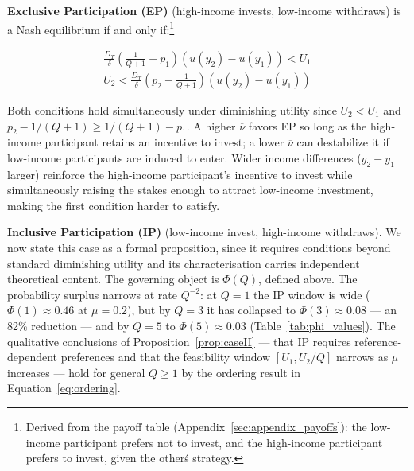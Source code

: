 \documentclass[
    oneside,
    fontsize=10pt,leqno]{article}
\begin{document}
\medskip
\noindent\textbf{Exclusive Participation (EP)} (high-income invests, low-income withdraws) is a Nash
equilibrium if and only if:\footnote{Derived from the payoff table (Appendix~\ref{sec:appendix_payoffs}): the low-income participant prefers not to invest, and the high-income participant prefers to invest, given the other\'s strategy.}

\begin{gather}
\frac{D_{T}}{\delta}\left(\frac{1}{Q+1}-p_{1}\right)(u(y_{2})-u(y_{1}))<U_{1}\label{eq:caseI_poor}\\
U_{2}<\frac{D_{T}}{\delta}\left(p_{2}-\frac{1}{Q+1}\right)(u(y_{2})-u(y_{1}))\label{eq:caseI_rich}
\end{gather}

Both conditions hold simultaneously under diminishing utility since
$U_{2}<U_{1}$ and $p_{2}-1/(Q+1)\geq1/(Q+1)-p_{1}$. A higher
$\overline{\nu}$ favors EP so long as the high-income participant retains an incentive
to invest; a lower $\overline{\nu}$ can destabilize it if low-income
participants are induced to enter. Wider income differences ($y_{2}-y_{1}$
larger) reinforce the high-income participant's incentive to invest while
simultaneously raising the stakes enough to attract low-income investment,
making the first condition harder to satisfy.

\medskip
\noindent\textbf{Inclusive Participation (IP)} (low-income invest, high-income withdraws). We now
state this case as a formal proposition, since it requires conditions
beyond standard diminishing utility and its characterisation carries
independent theoretical content. The governing object is $\Phi(Q)$,
defined above. The probability surplus narrows at rate $Q^{-2}$: at
$Q=1$ the IP window is wide ($\Phi(1)\approx0.46$ at $\mu=0.2$),
but by $Q=3$ it has collapsed to $\Phi(3)\approx0.08$ --- an 82\%
reduction --- and by $Q=5$ to $\Phi(5)\approx0.03$
(Table~\ref{tab:phi_values}). The qualitative conclusions of
Proposition~\ref{prop:caseII} --- that IP requires
reference-dependent preferences and that the feasibility window
$[U_1, U_2/Q]$ narrows as $\mu$ increases --- hold for general
$Q\geq1$ by the ordering result in Equation~\ref{eq:ordering}.
\end{document}
